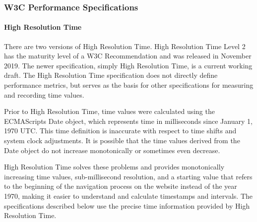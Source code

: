



\subsubsection{W3C Performance Specifications}
\label{subsubsection:w3c_performance_specifications}


\paragraph{High Resolution Time} %

There are two versions of High Resolution Time.
High Resolution Time Level 2 has the maturity level of a W3C Recommendation and was released in November 2019. %
The newer specification, simply High Resolution Time, is a current working draft. %
The High Resolution Time specification does not directly define performance metrics, but serves as the basis for other specifications for measuring and recording time values.


Prior to High Resolution Time, time values were calculated using the ECMAScripts Date object, which represents time in milliseconds since January 1, 1970 UTC. %
This time definition is inaccurate with respect to time shifts and system clock adjustments.
It is possible that the time values derived from the Date object do not increase monotonically or sometimes even decrease.

High Resolution Time solves these problems and provides monotonically increasing time values, sub-millisecond resolution, and a starting value that refers to the beginning of the navigation process on the website instead of the year 1970, making it easier to understand and calculate timestamps and intervals.
The specifications described below use the precise time information provided by High Resolution Time.

